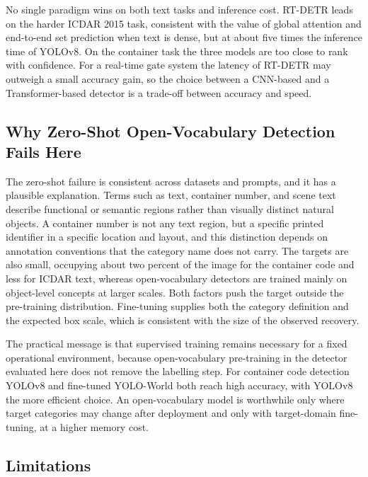 \documentclass[conference]{IEEEtran}
\begin{document}
No single paradigm wins on both text tasks and inference cost. RT-DETR leads on the harder ICDAR 2015 task, consistent with the value of global attention and end-to-end set prediction when text is dense, but at about five times the inference time of YOLOv8. On the container task the three models are too close to rank with confidence. For a real-time gate system the latency of RT-DETR may outweigh a small accuracy gain, so the choice between a CNN-based and a Transformer-based detector is a trade-off between accuracy and speed.

\subsection{Why Zero-Shot Open-Vocabulary Detection Fails Here}

The zero-shot failure is consistent across datasets and prompts, and it has a plausible explanation. Terms such as text, container number, and scene text describe functional or semantic regions rather than visually distinct natural objects. A container number is not any text region, but a specific printed identifier in a specific location and layout, and this distinction depends on annotation conventions that the category name does not carry. The targets are also small, occupying about two percent of the image for the container code and less for ICDAR text, whereas open-vocabulary detectors are trained mainly on object-level concepts at larger scales. Both factors push the target outside the pre-training distribution. Fine-tuning supplies both the category definition and the expected box scale, which is consistent with the size of the observed recovery.

The practical message is that supervised training remains necessary for a fixed operational environment, because open-vocabulary pre-training in the detector evaluated here does not remove the labelling step. For container code detection YOLOv8 and fine-tuned YOLO-World both reach high accuracy, with YOLOv8 the more efficient choice. An open-vocabulary model is worthwhile only where target categories may change after deployment and only with target-domain fine-tuning, at a higher memory cost.

\subsection{Limitations}
\label{sec:limitations}
\end{document}
